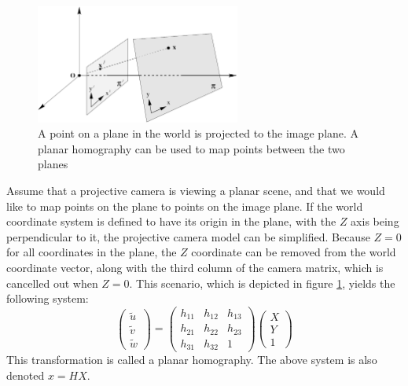 \begin{figure}[h]
\begin{center}
\includegraphics[width=0.6\textwidth]{figures/planar_homography.pdf}
\end{center}
\caption{A point on a plane in the world is projected to the image plane. A planar homography can be used to map points between the two planes} %
\label{fig:planar_homography}
\end{figure}

Assume that a projective camera is viewing a planar scene, and that we would like to map points on the plane to points on the image plane. 
If the world coordinate system is defined to have its origin in the plane, with the $Z$ axis being perpendicular to it, the projective camera model can be simplified. 
Because $Z=0$ for all coordinates in the plane, the $Z$ coordinate can be removed from the world coordinate vector, along with the third column of the camera matrix, which is cancelled out when $Z=0$. 
This scenario, which is depicted in figure \ref{fig:planar_homography}, yields the following system:
\begin{equation}\label{eq:homography}
\begin{pmatrix} \tilde{u} \\ \tilde{v} \\ \tilde{w} \end{pmatrix} =
\begin{pmatrix} h_{11} & h_{12} & h_{13}  \\
 				h_{21} & h_{22} & h_{23}  \\
				h_{31} & h_{32} & 1\end{pmatrix}
\begin{pmatrix}X \\Y \\ 1\end{pmatrix}
\end{equation}
This transformation is called a planar homography.
The above system is also denoted $x=HX$.

